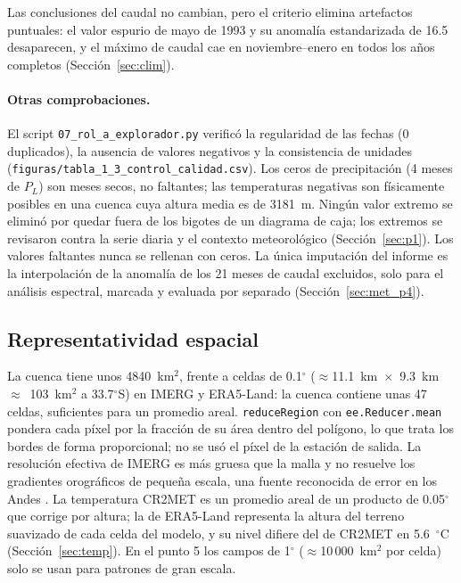 \documentclass[11pt,a4paper]{article}
\newcommand{\archivo}[1]{\nolinkurl{#1}}
\newcommand{\PL}{P_L}
\begin{document}
Las conclusiones del caudal no cambian, pero el criterio elimina artefactos puntuales: el valor espurio de mayo de 1993 y su anomalía estandarizada de 16.5 desaparecen, y el máximo de caudal cae en noviembre--enero en todos los años completos (Sección~\ref{sec:clim}).

\paragraph{Otras comprobaciones.} El script \archivo{07_rol_a_explorador.py} verificó la regularidad de las fechas (0 duplicados), la ausencia de valores negativos y la consistencia de unidades (\archivo{figuras/tabla_1_3_control_calidad.csv}). Los ceros de precipitación (4 meses de $\PL$) son meses secos, no faltantes; las temperaturas negativas son físicamente posibles en una cuenca cuya altura media es de 3181~m. Ningún valor extremo se eliminó por quedar fuera de los bigotes de un diagrama de caja; los extremos se revisaron contra la serie diaria y el contexto meteorológico (Sección~\ref{sec:p1}). Los valores faltantes nunca se rellenan con ceros. La única imputación del informe es la interpolación de la anomalía de los 21 meses de caudal excluidos, solo para el análisis espectral, marcada y evaluada por separado (Sección~\ref{sec:met_p4}).

\subsection{Representatividad espacial}

La cuenca tiene unos 4840~km$^2$, frente a celdas de 0.1$^\circ$ ($\approx$11.1~km~$\times$~9.3~km~$\approx$~103~km$^2$ a 33.7$^\circ$S) en IMERG y ERA5-Land: la cuenca contiene unas 47 celdas, suficientes para un promedio areal. \texttt{reduceRegion} con \texttt{ee.Reducer.mean} pondera cada píxel por la fracción de su área dentro del polígono, lo que trata los bordes de forma proporcional; no se usó el píxel de la estación de salida. La resolución efectiva de IMERG es más gruesa que la malla y no resuelve los gradientes orográficos de pequeña escala, una fuente reconocida de error en los Andes \citep{Zambrano2017,Rojas2021}. La temperatura CR2MET es un promedio areal de un producto de 0.05$^\circ$ que corrige por altura; la de ERA5-Land representa la altura del terreno suavizado de cada celda del modelo, y su nivel difiere del de CR2MET en 5.6~$^\circ$C (Sección~\ref{sec:temp}). En el punto 5 los campos de 1$^\circ$ ($\approx$10\,000~km$^2$ por celda) solo se usan para patrones de gran escala.
\end{document}
